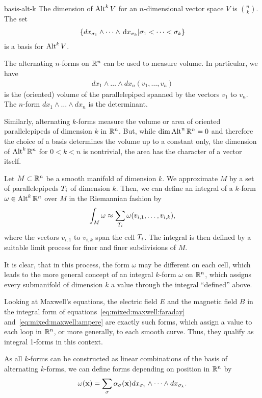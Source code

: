 \begin{Lemma}{basis-alt-k}
  The dimension of $\operatorname{Alt}^k V$ for an $n$-dimensional vector space $V$
  is $\binom nk$. The set
  \begin{gather}
    \left\{ dx_{\sigma_1}\wedge\dots\wedge\,\mathrm{d} x_{\sigma_k} \middle|
      \sigma_1 < \dots < \sigma_k \right\}
  \end{gather}
  is a basis for $\operatorname{Alt}^k V$.
\end{Lemma}

\begin{remark}
  The alternating $n$-forms on $\mathbb R^n$ can be used to measure volume. In particular,
  we have
  \begin{gather}
    dx_1\wedge\dots\wedge dx_n(v_1,\dots,v_n)
  \end{gather}
  is the (oriented) volume of the parallelepiped spanned by the
  vectors $v_1$ to $v_n$. The $n$-form $dx_1\wedge\dots\wedge dx_n$ is
  the determinant.

  Similarly, alternating $k$-forms measure the volume or area of oriented
  parallelepipeds of dimension $k$ in $\mathbb R^n$. But, while
  $\dim\operatorname{Alt}^n\mathbb R^n = 0$ and therefore the choice of a basis determines
  the volume up to a constant only, the dimension of $\operatorname{Alt}^k\mathbb R^n$ for
  $0<k<n$ is nontrivial, the area has the character of a vector itself.
  
\end{remark}

\begin{intro}
  Let $M \subset \mathbb R^n$ be a smooth manifold of dimension $k$. We
  approximate $M$ by a set of parallelepipeds $T_i$ of dimension
  $k$. Then, we can define an integral of a $k$-form
  $\omega\in \operatorname{Alt}^k\mathbb R^n$ over $M$ in the Riemannian fashion by
  \begin{gather}
    \int_M \omega \approx \sum_{T_i} \omega(v_{i,1},\dots, v_{i,k}),
  \end{gather}
  where the vectors $v_{i,1}$ to $v_{i,k}$ span the cell
  $T_i$. The integral is then defined by a suitable limit process
  for finer and finer subdivisions of $M$.

  It is clear, that in this process, the form $\omega$ may be
  different on each cell, which leads to the more general concept of
  an integral $k$-form $\omega$ on $\mathbb R^n$, which assigns every
  submanifold of dimension $k$ a value through the integral
  ``defined'' above.

  Looking at Maxwell's equations, the electric field $E$ and the
  magnetic field $B$ in the integral form of
  equations~\eqref{eq:mixed:maxwell:faraday}
  and~\eqref{eq:mixed:maxwell:ampere} are exactly such forms, which
  assign a value to each loop in $\mathbb R^n$, or more generally, to each
  smooth curve. Thus, they qualify as integral 1-forms in this
  context.

  As all $k$-forms can be constructed as linear combinations of the
  basis of alternating $k$-forms, we can define forms depending on
  position in $\mathbb R^n$ by
  \begin{gather}
    \omega(\mathbf x) = \sum_{\sigma} \alpha_{\sigma}(\mathbf x)
    dx_{\sigma_1}\wedge\dots\wedge dx_{\sigma_k}.
  \end{gather}
\end{intro}

